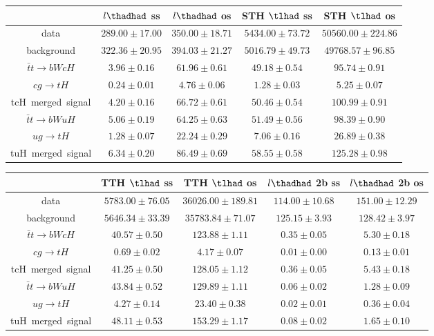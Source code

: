 \centering
\begin{tabular}{|c|c|c|c|c|} \hline
 & $l\thadhad$ ss & $l\thadhad$ os & STH $\tlhad$ ss & STH $\tlhad$ os\\\hline
data & $289.00\pm17.00$ & $350.00\pm18.71$ & $5434.00\pm73.72$ & $50560.00\pm224.86$\\\hline
background & $322.36\pm20.95$ & $394.03\pm21.27$ & $5016.79\pm49.73$ & $49768.57\pm96.85$\\\hline
$\bar{t}t\to bWcH$ & $3.96\pm0.16$ & $61.96\pm0.61$ & $49.18\pm0.54$ & $95.74\pm0.91$\\\hline
$cg\to tH$ & $0.24\pm0.01$ & $4.76\pm0.06$ & $1.28\pm0.03$ & $5.25\pm0.07$\\\hline
tcH~merged~signal & $4.20\pm0.16$ & $66.72\pm0.61$ & $50.46\pm0.54$ & $100.99\pm0.91$\\\hline
$\bar{t}t\to bWuH$ & $5.06\pm0.19$ & $64.25\pm0.63$ & $51.49\pm0.56$ & $98.39\pm0.90$\\\hline
$ug\to tH$ & $1.28\pm0.07$ & $22.24\pm0.29$ & $7.06\pm0.16$ & $26.89\pm0.38$\\\hline
tuH~merged~signal & $6.34\pm0.20$ & $86.49\pm0.69$ & $58.55\pm0.58$ & $125.28\pm0.98$\\\hline
\end{tabular}
\begin{tabular}{|c|c|c|c|c|} \hline
 & TTH $\tlhad$ ss & TTH $\tlhad$ os & $l\thadhad$ 2b ss & $l\thadhad$ 2b os\\\hline
data & $5783.00\pm76.05$ & $36026.00\pm189.81$ & $114.00\pm10.68$ & $151.00\pm12.29$\\\hline
background & $5646.34\pm33.39$ & $35783.84\pm71.07$ & $125.15\pm3.93$ & $128.42\pm3.97$\\\hline
$\bar{t}t\to bWcH$ & $40.57\pm0.50$ & $123.88\pm1.11$ & $0.35\pm0.05$ & $5.30\pm0.18$\\\hline
$cg\to tH$ & $0.69\pm0.02$ & $4.17\pm0.07$ & $0.01\pm0.00$ & $0.13\pm0.01$\\\hline
tcH~merged~signal & $41.25\pm0.50$ & $128.05\pm1.12$ & $0.36\pm0.05$ & $5.43\pm0.18$\\\hline
$\bar{t}t\to bWuH$ & $43.84\pm0.52$ & $129.89\pm1.11$ & $0.06\pm0.02$ & $1.28\pm0.09$\\\hline
$ug\to tH$ & $4.27\pm0.14$ & $23.40\pm0.38$ & $0.02\pm0.01$ & $0.36\pm0.04$\\\hline
tuH~merged~signal & $48.11\pm0.53$ & $153.29\pm1.17$ & $0.08\pm0.02$ & $1.65\pm0.10$\\\hline
\end{tabular}

